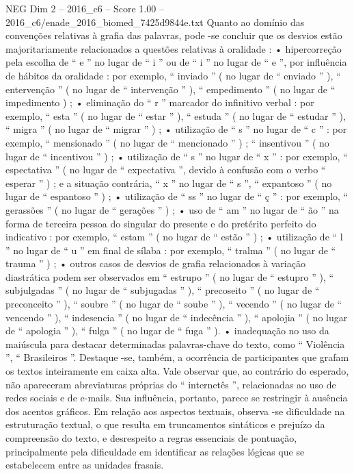 \begin{textsample}{NEG Dim 2 – 2016\_c6 – Score 1.00 – 2016\_c6/enade\_2016\_biomed\_7425d9844e.txt}
Quanto ao domínio das convenções relativas à grafia das palavras, pode -se concluir que os desvios estão majoritariamente relacionados a questões relativas à oralidade : • hipercorreção pela escolha de “ e ” no lugar de “ i ” ou de “ i ” no lugar de “ e ”, por influência de hábitos da oralidade : por exemplo, “ inviado ” ( no lugar de “ enviado ” ), “ entervenção ” ( no lugar de “ intervenção ” ), “ empedimento ” ( no lugar de “ impedimento ) ; • eliminação do “ r ” marcador do infinitivo verbal : por exemplo, “ esta ” ( no lugar de “ estar ” ), “ estuda ” ( no lugar de “ estudar ” ), “ migra ” ( no lugar de “ migrar ” ) ; • utilização de “ s ” no lugar de “ c ” : por exemplo, “ mensionado ” ( no lugar de “ mencionado ” ) ; “ insentivou ” ( no lugar de “ incentivou ” ) ; • utilização de “ s ” no lugar de “ x ” : por exemplo, “ espectativa ” ( no lugar de “ expectativa ”, devido à confusão com o verbo “ esperar ” ) ; e a situação contrária, “ x ” no lugar de “ s ”, “ expantoso ” ( no lugar de “ espantoso ” ) ; • utilização de “ ss ” no lugar de “ ç ” : por exemplo, “ gerassões ” ( no lugar de “ gerações ” ) ; • uso de “ am ” no lugar de “ ão ” na forma de terceira pessoa do singular do presente e do pretérito perfeito do indicativo : por exemplo, “ estam ” ( no lugar de “ estão ” ) ; • utilização de “ l ” no lugar de “ u ” em final de sílaba : por exemplo, “ tralma ” ( no lugar de “ trauma ” ) ; • outros casos de desvios de grafia relacionados à variação diastrática podem ser observados em “ estrupo ” ( no lugar de “ estupro ” ), “ subjulgadas ” ( no lugar de “ subjugadas ” ), “ precoseito ” ( no lugar de “ preconceito ” ), “ soubre ” ( no lugar de “ soube ” ), “ vecendo ” ( no lugar de “ vencendo ” ), “ indesencia ” ( no lugar de “ indecência ” ), “ apolojia ” ( no lugar de “ apologia ” ), “ fulga ” ( no lugar de “ fuga ” ). • inadequação no uso da maiúscula para destacar determinadas palavras-chave do texto, como “ Violência ”, “ Brasileiros ”.
Destaque -se, também, a ocorrência de participantes que grafam os textos inteiramente em caixa alta.
Vale observar que, ao contrário do esperado, não apareceram abreviaturas próprias do “ internetês ”, relacionadas ao uso de redes sociais e de e-mails.
Sua influência, portanto, parece se restringir à ausência dos acentos gráficos.
Em relação aos aspectos textuais, observa -se dificuldade na estruturação textual, o que resulta em truncamentos sintáticos e prejuízo da compreensão do texto, e desrespeito a regras essenciais de pontuação, principalmente pela dificuldade em identificar as relações lógicas que se estabelecem entre as unidades frasais.

\end{textsample}
